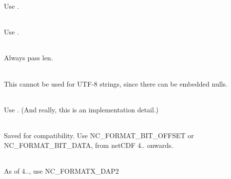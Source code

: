 \begin{DoxyRefList}
\label{deprecated__deprecated000132}%
%
Use .  
\item[{\parbox[t]{\linewidth}{Class \doxylink{class_json_1_1_styled_writer}{Json::\+Styled\+Writer} }}]\hfill \\
\label{deprecated__deprecated000131}%
%
Use .  
\item[{\parbox[t]{\linewidth}{Member \doxylink{class_json_1_1_value_a29f3a30f7e5d3af6f38d57999bf5b480}{Json::\+Value::\+set\+Comment} (const char \texorpdfstring{$\ast$}{*}comment, Comment\+Placement placement)}}]\hfill \\
\label{deprecated__deprecated000123}%
%
Always pass len.  
\item[{\parbox[t]{\linewidth}{Member \doxylink{class_json_1_1_value_iterator_base_a54765da6759fd3f1edcbfbaf308ec263}{Json::\+Value\+Iterator\+Base::\+member\+Name} () const}}]\hfill \\
\label{deprecated__deprecated000124}%
%
This cannot be used for UTF-\/8 strings, since there can be embedded nulls.  
\item[{\parbox[t]{\linewidth}{Class \doxylink{class_json_1_1_writer}{Json::\+Writer} }}]\hfill \\
\label{deprecated__deprecated000129}%
%
Use . (And really, this is an implementation detail.)  
\item[{\parbox[t]{\linewidth}{Member \doxylink{netcdf_8h_a873a71c6bff84c3371949822dbf5bb50}{NC\+\_\+\+FORMAT\+\_\+64\+BIT} }}]\hfill \\
\label{deprecated__deprecated000139}%
%
Saved for compatibility. Use NC\+\_\+\+FORMAT\+\_\+BIT\+\_\+\+OFFSET or NC\+\_\+\+FORMAT\+\_\+BIT\+\_\+\+DATA, from net\+CDF 4.. onwards.  
\item[{\parbox[t]{\linewidth}{Member \doxylink{netcdf_8h_aef1637d8dda80dc306bd259513f36f66}{NC\+\_\+\+FORMAT\+\_\+\+DAP2} }}]\hfill \\
\label{deprecated__deprecated000145}%
%
As of 4.., use NC\+\_\+\+FORMATX\+\_\+\+DAP2  
\item[{\parbox[t]{\linewidth}{Member \doxylink{netcdf_8h_a981872dfeacb34ec6b1a693317e6d0f5}{NC\+\_\+\+FORMAT\+\_\+\+DAP4} }}]\hfill \\

\end{DoxyRefList}

